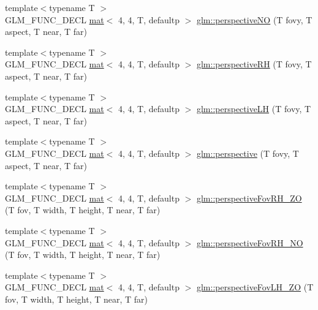 \begin{DoxyCompactItemize}
\item 
{\footnotesize template$<$typename T $>$ }\\G\+L\+M\+\_\+\+F\+U\+N\+C\+\_\+\+D\+E\+CL \hyperlink{structglm_1_1mat}{mat}$<$ 4, 4, T, defaultp $>$ \hyperlink{group__gtc__matrix__transform_gaf497e6bca61e7c87088370b126a93758}{glm\+::perspective\+NO} (T fovy, T aspect, T near, T far)
\item 
{\footnotesize template$<$typename T $>$ }\\G\+L\+M\+\_\+\+F\+U\+N\+C\+\_\+\+D\+E\+CL \hyperlink{structglm_1_1mat}{mat}$<$ 4, 4, T, defaultp $>$ \hyperlink{group__gtc__matrix__transform_ga26b88757fbd90601b80768a7e1ad3aa1}{glm\+::perspective\+RH} (T fovy, T aspect, T near, T far)
\item 
{\footnotesize template$<$typename T $>$ }\\G\+L\+M\+\_\+\+F\+U\+N\+C\+\_\+\+D\+E\+CL \hyperlink{structglm_1_1mat}{mat}$<$ 4, 4, T, defaultp $>$ \hyperlink{group__gtc__matrix__transform_ga9bd34951dc7022ac256fcb51d7f6fc2f}{glm\+::perspective\+LH} (T fovy, T aspect, T near, T far)
\item 
{\footnotesize template$<$typename T $>$ }\\G\+L\+M\+\_\+\+F\+U\+N\+C\+\_\+\+D\+E\+CL \hyperlink{structglm_1_1mat}{mat}$<$ 4, 4, T, defaultp $>$ \hyperlink{group__gtc__matrix__transform_ga747c8cf99458663dd7ad1bb3a2f07787}{glm\+::perspective} (T fovy, T aspect, T near, T far)
\item 
{\footnotesize template$<$typename T $>$ }\\G\+L\+M\+\_\+\+F\+U\+N\+C\+\_\+\+D\+E\+CL \hyperlink{structglm_1_1mat}{mat}$<$ 4, 4, T, defaultp $>$ \hyperlink{group__gtc__matrix__transform_ga7dcbb25331676f5b0795aced1a905c44}{glm\+::perspective\+Fov\+R\+H\+\_\+\+ZO} (T fov, T width, T height, T near, T far)
\item 
{\footnotesize template$<$typename T $>$ }\\G\+L\+M\+\_\+\+F\+U\+N\+C\+\_\+\+D\+E\+CL \hyperlink{structglm_1_1mat}{mat}$<$ 4, 4, T, defaultp $>$ \hyperlink{group__gtc__matrix__transform_ga257b733ff883c9a065801023cf243eb2}{glm\+::perspective\+Fov\+R\+H\+\_\+\+NO} (T fov, T width, T height, T near, T far)
\item 
{\footnotesize template$<$typename T $>$ }\\G\+L\+M\+\_\+\+F\+U\+N\+C\+\_\+\+D\+E\+CL \hyperlink{structglm_1_1mat}{mat}$<$ 4, 4, T, defaultp $>$ \hyperlink{group__gtc__matrix__transform_gabdd37014f529e25b2fa1b3ba06c10d5c}{glm\+::perspective\+Fov\+L\+H\+\_\+\+ZO} (T fov, T width, T height, T near, T far)

\end{DoxyCompactItemize}
